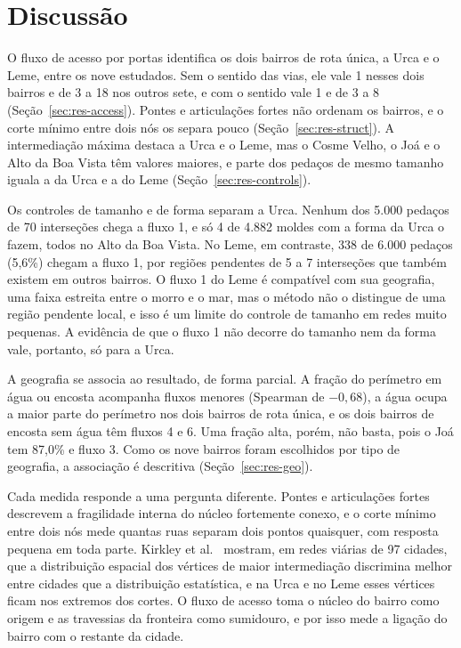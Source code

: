 \FloatBarrier
\section{Discussão}
\label{sec:discussion}

O fluxo de acesso por portas identifica os dois bairros de rota única, a Urca e
o Leme, entre os nove estudados. Sem o sentido das vias, ele vale 1 nesses dois
bairros e de 3 a 18 nos outros sete, e com o sentido vale 1 e de 3 a 8
(Seção~\ref{sec:res-access}). Pontes e articulações fortes não ordenam os
bairros, e o corte mínimo entre dois nós os separa pouco
(Seção~\ref{sec:res-struct}). A intermediação máxima destaca a Urca e o Leme,
mas o Cosme Velho, o Joá e o Alto da Boa Vista têm valores maiores, e parte dos
pedaços de mesmo tamanho iguala a da Urca e a do Leme
(Seção~\ref{sec:res-controls}).

Os controles de tamanho e de forma separam a Urca. Nenhum dos 5.000 pedaços de
70 interseções chega a fluxo 1, e só 4 de 4.882 moldes com a forma da Urca o
fazem, todos no Alto da Boa Vista. No Leme, em contraste, 338 de 6.000 pedaços
(5,6\%) chegam a fluxo 1, por regiões pendentes de 5 a 7 interseções que
também existem em outros bairros. O fluxo 1 do Leme é compatível com sua
geografia, uma faixa estreita entre o morro e o mar, mas o método não o
distingue de uma região pendente local, e isso é um limite do controle de
tamanho em redes muito pequenas. A evidência de que o fluxo 1 não decorre do
tamanho nem da forma vale, portanto, só para a Urca.

A geografia se associa ao resultado, de forma parcial. A fração do perímetro
em água ou encosta acompanha fluxos menores (Spearman de $-0{,}68$), a água
ocupa a maior parte do perímetro nos dois bairros de rota única, e os dois
bairros de encosta sem água têm fluxos 4 e 6. Uma fração alta, porém, não
basta, pois o Joá tem 87,0\% e fluxo 3. Como os nove bairros foram escolhidos
por tipo de geografia, a associação é descritiva (Seção~\ref{sec:res-geo}).

Cada medida responde a uma pergunta diferente. Pontes e articulações fortes
descrevem a fragilidade interna do núcleo fortemente conexo, e o corte mínimo
entre dois nós mede quantas ruas separam dois pontos quaisquer, com resposta
pequena em toda parte. Kirkley et al.~\cite{kirkley2018betweenness} mostram,
em redes viárias de 97 cidades, que a distribuição espacial dos vértices de
maior intermediação discrimina melhor entre cidades que a distribuição
estatística, e na Urca e no Leme esses vértices ficam nos extremos dos cortes.
O fluxo de acesso toma o núcleo do bairro como origem e as travessias da
fronteira como sumidouro, e por isso mede a ligação do bairro com o restante
da cidade.

